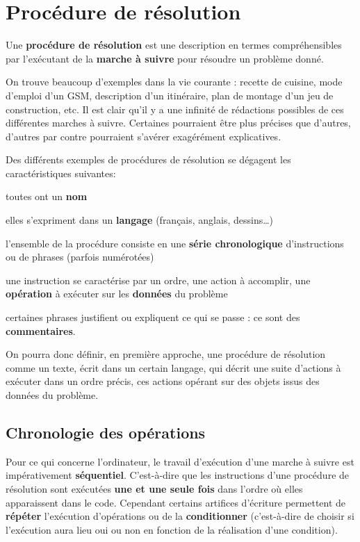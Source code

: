 \section{Procédure de résolution}

	Une \textbf{procédure de résolution }est une description en termes
	compréhensibles par l'exécutant de la \textbf{marche à
	suivre} pour résoudre un problème donné.
	
	On trouve beaucoup d'exemples dans la vie courante :
	recette de cuisine, mode d’emploi d’un GSM, description d’un
	itinéraire, plan de montage d’un jeu de construction, etc. Il est clair
	qu’il y a une infinité de rédactions possibles de ces différentes
	marches à suivre. Certaines pourraient être plus précises que d’autres,
	d’autres par contre pourraient s’avérer exagérément explicatives.
	
	Des différents exemples de procédures de résolution se dégagent les
	caractéristiques suivantes:

	\begin{liste}
	\item toutes ont un \textbf{nom}
	\item elles s’expriment dans un \textbf{langage}
		(français, anglais, dessins…)
	\item l’ensemble de la procédure consiste 
		en une \textbf{série chronologique}
		d’instructions ou de phrases (parfois numérotées)
	\item une instruction se caractérise par un ordre, 
		une action à accomplir,
		une \textbf{opération} à exécuter sur les \textbf{données} du problème
	\item certaines phrases justifient ou expliquent ce qui se passe : 
		ce sont des \textbf{commentaires}.
	\end{liste}

	On pourra donc définir, en première approche, une procédure de
	résolution comme un texte, écrit dans un certain langage, qui décrit
	une suite d’actions à exécuter dans un ordre précis, ces actions
	opérant sur des objets issus des données du problème.

	\subsection{Chronologie des opérations}

		Pour ce qui concerne l’ordinateur, le travail d’exécution d’une marche à
		suivre est impérativement \textbf{séquentiel}. C’est-à-dire que les
		instructions d’une procédure de résolution sont exécutées \textbf{une
		et une seule fois} dans l’ordre où elles apparaissent dans le code.
		Cependant certains artifices d’écriture permettent de \textbf{répéter}
		l’exécution d’opérations ou de la \textbf{conditionner}
		(c'est-à-dire de choisir si
		l'exécution aura lieu oui ou non en fonction de la
		réalisation d'une condition).

